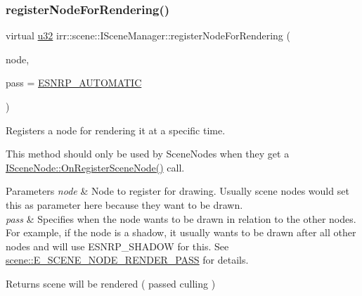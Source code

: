 \subsubsection{\texorpdfstring{register\+Node\+For\+Rendering()}{registerNodeForRendering()}\hspace{0.1cm}{\footnotesize\ttfamily [2/2]}}
{\footnotesize\ttfamily virtual \hyperlink{namespaceirr_a0416a53257075833e7002efd0a18e804}{u32} irr\+::scene\+::\+I\+Scene\+Manager\+::register\+Node\+For\+Rendering (\begin{DoxyParamCaption}\item[{\hyperlink{classirr_1_1scene_1_1ISceneNode}{I\+Scene\+Node} $\ast$}]{node,  }\item[{\hyperlink{namespaceirr_1_1scene_a7862269bd1abc123929d4dbb8200d67f}{E\+\_\+\+S\+C\+E\+N\+E\+\_\+\+N\+O\+D\+E\+\_\+\+R\+E\+N\+D\+E\+R\+\_\+\+P\+A\+SS}}]{pass = {\ttfamily \hyperlink{namespaceirr_1_1scene_a7862269bd1abc123929d4dbb8200d67fad9a67a121247bc1001e35b8a8c0ef20d}{E\+S\+N\+R\+P\+\_\+\+A\+U\+T\+O\+M\+A\+T\+IC}} }\end{DoxyParamCaption})\hspace{0.3cm}{\ttfamily [pure virtual]}}



Registers a node for rendering it at a specific time. 

This method should only be used by Scene\+Nodes when they get a \hyperlink{classirr_1_1scene_1_1ISceneNode_ac9795bfcb88dcaf8cba6ea3296e5d8d0}{I\+Scene\+Node\+::\+On\+Register\+Scene\+Node()} call. 
\begin{DoxyParams}{Parameters}
{\em node} & Node to register for drawing. Usually scene nodes would set \textquotesingle{}this\textquotesingle{} as parameter here because they want to be drawn. \\
\hline
{\em pass} & Specifies when the node wants to be drawn in relation to the other nodes. For example, if the node is a shadow, it usually wants to be drawn after all other nodes and will use E\+S\+N\+R\+P\+\_\+\+S\+H\+A\+D\+OW for this. See \hyperlink{namespaceirr_1_1scene_a7862269bd1abc123929d4dbb8200d67f}{scene\+::\+E\+\_\+\+S\+C\+E\+N\+E\+\_\+\+N\+O\+D\+E\+\_\+\+R\+E\+N\+D\+E\+R\+\_\+\+P\+A\+SS} for details. \\
\hline
\end{DoxyParams}
\begin{DoxyReturn}{Returns}
scene will be rendered ( passed culling ) 
\end{DoxyReturn}
\mbox{\label{classirr_1_1scene_1_1ISceneManager_af48c93cc41f986f08ed964cc575ee7a0}} 
